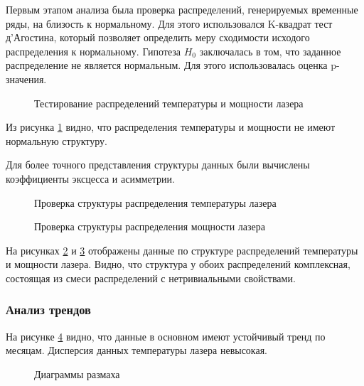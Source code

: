 Первым этапом анализа была проверка распределений,
генерируемых временные ряды, на близость к нормальному.
Для этого использовался K-квадрат тест д'Агостина,
который позволяет определить меру сходимости исходого распределения к нормальному.
Гипотеза $H_0$ заключалась в том, что заданное распределение не является нормальным.
Для этого использовалась оценка p-значения.

\begin{figure}[H]
    \caption{Тестирование распределений температуры и мощности лазера}
    \label{normaltest}
\end{figure}

Из рисунка \ref{normaltest} видно, что распределения температуры и мощности
не имеют нормальную структуру.

Для более точного представления структуры данных
были вычислены коэффициенты эксцесса и асимметрии.

\begin{figure}[H]
    \caption{Проверка структуры распределения температуры лазера}
    \label{tempstruct}
\end{figure}

\begin{figure}[H]
    \caption{Проверка структуры распределения мощности лазера}
    \label{powerstruct}
\end{figure}

На рисунках \ref{tempstruct} и \ref{powerstruct} отображены данные по структуре распределений
температуры и мощности лазера.
Видно, что структура у обоих распределений комплексная,
состоящая из смеси распределений с нетривиальными свойствами.

\newpage

\subsubsection{Анализ трендов}

На рисунке \ref{trends} видно, что данные в основном
имеют устойчивый тренд по месяцам.
Дисперсия данных температуры лазера невысокая.

\begin{figure}[H]
    \caption{Диаграммы размаха}
    \label{trends}
\end{figure}

